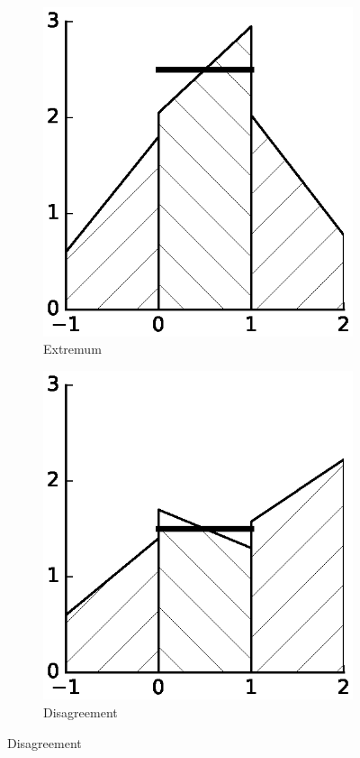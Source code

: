 \documentclass[11pt]{beamer}
\begin{document}
\begin{frame}
\begin{figure}[h]
\begin{subfigure}{0.3\textwidth}
      \includegraphics[width=\textwidth]{figures/minmod/extremum}
      \caption{Extremum}
    \end{subfigure}
    \hfill
    \begin{subfigure}{0.3\textwidth}
      \centering
      \includegraphics[width=\textwidth]{figures/minmod/disagreement}
      \caption{Disagreement}
    \end{subfigure}
  \end{figure}
\end{frame}
\end{document}
